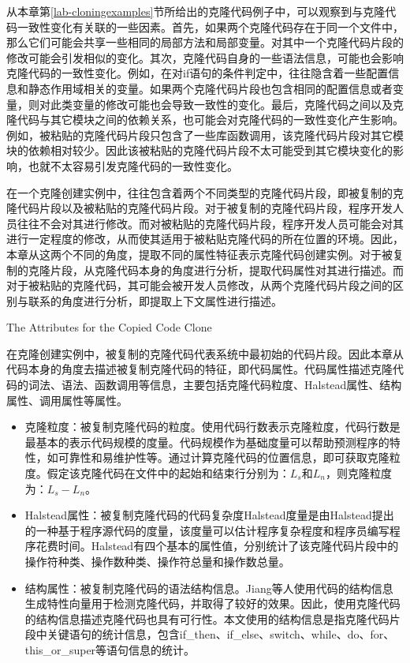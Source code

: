 从本章第\ref{lab-cloningexamples}节所给出的克隆代码例子中，可以观察到与克隆代码一致性变化有关联的一些因素。首先，如果两个克隆代码存在于同一个文件中，那么它们可能会共享一些相同的局部方法和局部变量。对其中一个克隆代码片段的修改可能会引发相似的变化。其次，克隆代码自身的一些语法信息，可能也会影响克隆代码的一致性变化。例如，在对{if}语句的条件判定中，往往隐含着一些配置信息和静态作用域相关的变量。如果两个克隆代码片段也包含相同的配置信息或者变量，则对此类变量的修改可能也会导致一致性的变化。最后，克隆代码之间以及克隆代码与其它模块之间的依赖关系，也可能会对克隆代码的一致性变化产生影响。例如，被粘贴的克隆代码片段只包含了一些库函数调用，该克隆代码片段对其它模块的依赖相对较少。因此该被粘贴的克隆代码片段不太可能受到其它模块变化的影响，也就不太容易引发克隆代码的一致性变化。

在一个克隆创建实例中，往往包含着两个不同类型的克隆代码片段，即被复制的克隆代码片段以及被粘贴的克隆代码片段。对于被复制的克隆代码片段，程序开发人员往往不会对其进行修改。而对被粘贴的克隆代码片段，程序开发人员可能会对其进行一定程度的修改，从而使其适用于被粘贴克隆代码的所在位置的环境。因此，本章从这两个不同的角度，提取不同的属性特征表示克隆代码创建实例。对于被复制的克隆片段，从克隆代码本身的角度进行分析，提取代码属性对其进行描述。而对于被粘贴的克隆代码，其可能会被开发人员修改，从两个克隆代码片段之间的区别与联系的角度进行分析，即提取上下文属性进行描述。

{The Attributes for the Copied Code Clone}

在克隆创建实例中，被复制的克隆代码代表系统中最初始的代码片段。因此本章从代码本身的角度去描述被复制克隆代码的特征，即代码属性。代码属性描述克隆代码的词法、语法、函数调用等信息，主要包括克隆代码粒度、Halstead属性、结构属性、调用属性等属性。

\begin{itemize}
\item 
克隆粒度：被复制克隆代码的粒度。使用代码行数表示克隆粒度，代码行数是最基本的表示代码规模的度量。代码规模作为基础度量可以帮助预测程序的特性，如可靠性和易维护性等\cite{ramamoorthy1984software}。通过计算克隆代码的位置信息，即可获取克隆粒度。假定该克隆代码在文件中的起始和结束行分别为：$L_s$和$L_n$，则克隆粒度为：{$L_s - L_n$}。
\item 
Halstead属性：被复制克隆代码的代码复杂度Halstead度量\cite{jones1994software}是由Halstead提出的一种基于程序源代码的度量，该度量可以估计程序复杂程度和程序员编写程序花费时间。Halstead有四个基本的属性值，分别统计了该克隆代码片段中的操作符种类、操作数种类、操作符总量和操作数总量。
\item  
结构属性：被复制克隆代码的语法结构信息。Jiang等人使用代码的结构信息生成特性向量用于检测克隆代码，并取得了较好的效果\cite{jiang2007deckard}。因此，使用克隆代码的结构信息描述克隆代码也具有可行性。本文使用的结构信息是指克隆代码片段中关键语句的统计信息，包含{if\_then、if\_else、switch、while、do、for、this\_or\_super}等语句信息的统计。
\end{itemize}


